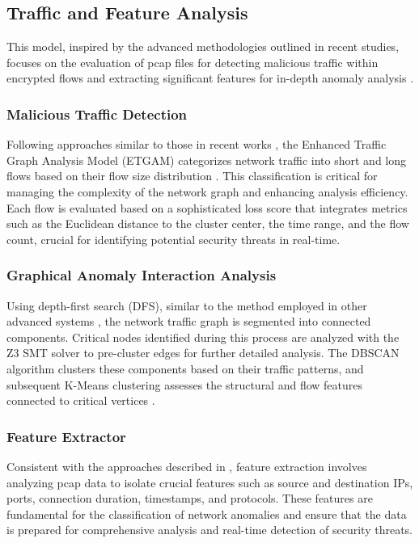 
\subsection{Traffic and Feature Analysis}
This model, inspired by the advanced methodologies outlined in recent studies, focuses on the evaluation of pcap files for detecting malicious traffic within encrypted flows and extracting significant features for in-depth anomaly analysis \cite{24, 26}.

\subsubsection{Malicious Traffic Detection}
Following approaches similar to those in recent works \cite{24, 26}, the Enhanced Traffic Graph Analysis Model (ETGAM) categorizes network traffic into short and long flows based on their flow size distribution \cite{25}. This classification is critical for managing the complexity of the network graph and enhancing analysis efficiency. Each flow is evaluated based on a sophisticated loss score that integrates metrics such as the Euclidean distance to the cluster center, the time range, and the flow count, crucial for identifying potential security threats in real-time.

\subsubsection{Graphical Anomaly Interaction Analysis}
Using depth-first search (DFS), similar to the method employed in other advanced systems \cite{26}, the network traffic graph is segmented into connected components. Critical nodes identified during this process are analyzed with the Z3 SMT solver to pre-cluster edges for further detailed analysis. The DBSCAN algorithm clusters these components based on their traffic patterns, and subsequent K-Means clustering assesses the structural and flow features connected to critical vertices \cite{24, 26}.

\subsubsection{Feature Extractor}
Consistent with the approaches described in \cite{24, 25}, feature extraction involves analyzing pcap data to isolate crucial features such as source and destination IPs, ports, connection duration, timestamps, and protocols. These features are fundamental for the classification of network anomalies and ensure that the data is prepared for comprehensive analysis and real-time detection of security threats.
